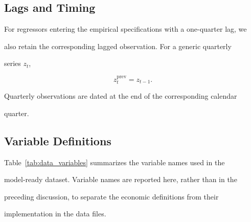 \documentclass[11pt]{article}
\begin{document}
\subsection{Lags and Timing}

For regressors entering the empirical specifications with a one-quarter lag, we

also retain the corresponding lagged observation. For a generic quarterly

series $z_t$,

\begin{equation}
z_t^{\mathrm{prev}}
=
z_{t-1}.
\end{equation}

Quarterly observations are dated at the end of the corresponding calendar

quarter.



\subsection{Variable Definitions}

Table~\ref{tab:data_variables} summarizes the variable names used in the

model-ready dataset. Variable names are reported here, rather than in the

preceding discussion, to separate the economic definitions from their

implementation in the data files.

\small
\end{document}
